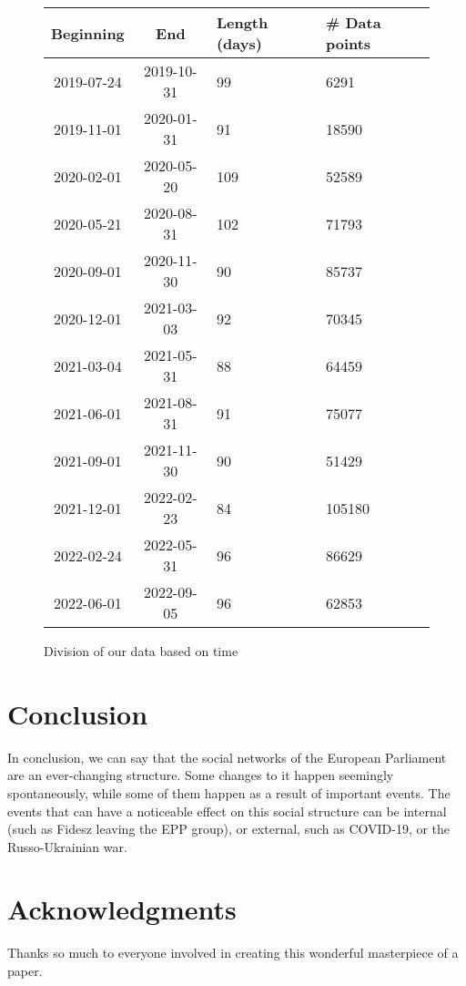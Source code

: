 \documentclass[lettersize,journal]{IEEEtran}
\begin{document}
\begin{figure}[h]
	\begin{center}
		
		\begin{tabular}{| c | c | p{1cm} | p{1cm} |}
			\hline
			Beginning & End  & Length (days) & \# Data points \\
			\hline
			2019-07-24 & 2019-10-31 & 99 & 6291 \\
			2019-11-01 & 2020-01-31 & 91 & 18590 \\
			2020-02-01 & 2020-05-20 & 109 & 52589 \\
			2020-05-21 & 2020-08-31 & 102 & 71793 \\
			2020-09-01 & 2020-11-30 & 90 & 85737 \\
			2020-12-01 & 2021-03-03 & 92 & 70345 \\
			2021-03-04 & 2021-05-31 & 88 & 64459 \\
			2021-06-01 & 2021-08-31 & 91 & 75077 \\
			2021-09-01 & 2021-11-30 & 90 & 51429 \\
			2021-12-01 & 2022-02-23 & 84 & 105180 \\
			2022-02-24 & 2022-05-31 & 96 & 86629 \\
			2022-06-01 & 2022-09-05 & 96 & 62853 \\
			\hline
		\end{tabular}
	\caption{Division of our data based on time}
	\label{tab1}
	\end{center}
\end{figure}

\section{Conclusion} \label{sec:conclusion}

In conclusion, we can say that the social networks of the European Parliament are an ever-changing structure. Some changes to it happen seemingly spontaneously, while some of them happen as a result of important events. The events that can have a noticeable effect on this social structure can be internal (such as Fidesz leaving the EPP group), or external, such as COVID-19, or the Russo-Ukrainian war.

\section*{Acknowledgments}

Thanks so much to everyone involved in creating this wonderful masterpiece of a paper.
\end{document}

